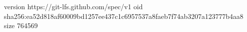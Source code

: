 version https://git-lfs.github.com/spec/v1
oid sha256:ea52d818af60009bd1257ee437c1c6957537a8faeb7f74ab3207a123777b4aa8
size 764569
